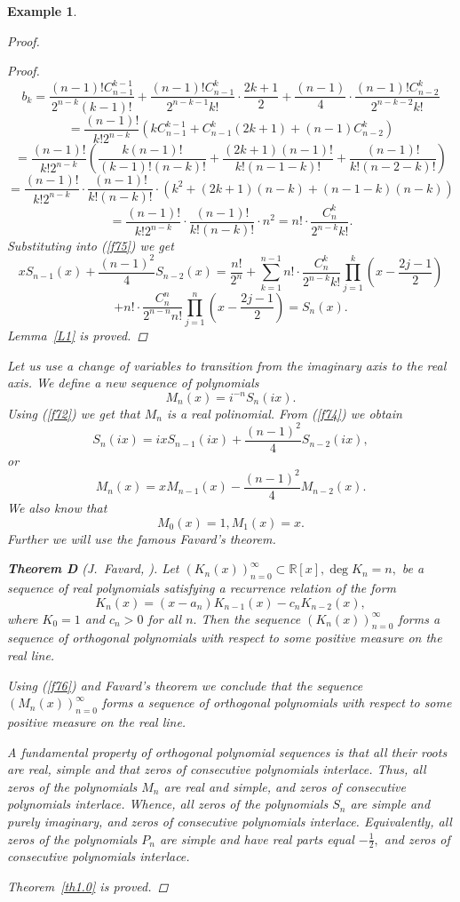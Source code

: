 \documentclass[12pt]{amsart}
\newcounter{count}
\numberwithin{count}{section}
\newtheorem{Example}[count]{Example}
\begin{document}
\begin{Example}
\begin{proof}
\begin{proof}
$$b_k = \frac{(n-1)! C_{n-1}^{k-1}}{2^{n-k} (k-1)!} + 
\frac{(n-1)! C_{n-1}^{k}}{2^{n-k-1} k!}\cdot \frac{2k+1}{2} 
 +\frac{(n-1)}{4} \cdot 
\frac{(n-1)! C_{n-2}^{k}}{2^{n-k-2} k!}     $$
$$= \frac{(n-1)!}{k! 2^{n-k}}\left(k C_{n-1}^{k-1} +C_{n-1}^{k}(2k+1) +
(n-1) C_{n-2}^{k} \right)       $$
$$ = \frac{(n-1)!}{k! 2^{n-k}}\left(\frac{k(n-1)!}{(k-1)!(n-k)!} +\frac{(2k+1)(n-1)!}{k!(n-1-k)!} 
+ \frac{(n-1)!}{k!(n-2-k)!}   \right)    $$
$$    = \frac{(n-1)!}{k! 2^{n-k}} \cdot \frac{(n-1)!}{k!(n-k)!} \cdot \left(k^2 +(2k+1)(n-k) +(n-1-k)(n-k)\right)$$
$$ = \frac{(n-1)!}{k! 2^{n-k}} \cdot \frac{(n-1)!}{k!(n-k)!} \cdot n^2  =n! \cdot \frac{C_n^k}{2^{n-k}k!}.   $$
Substituting into (\ref{f75}) we get
$$ x S_{n-1}(x) + \frac{(n-1)^2}{4} S_{n-2}(x) =  \frac{n!}{2^n}+ \sum_{k=1}^{n-1}  n! \cdot \frac{C_n^k}{2^{n-k}k!}
\prod_{j=1}^k \left(x- \frac{2j-1}{2}\right)$$
$$ +  n! \cdot \frac{C_n^n}{2^{n-n}n!}\prod_{j=1}^n \left(x- \frac{2j-1}{2}\right)  = S_n(x). $$
Lemma~\ref{L1} is proved.
\end{proof}

Let us use a change of variables to transition from the imaginary axis to the
real axis. We define a new sequence of polynomials
$$M_n(x) = i^{-n} S_n(ix).$$
Using (\ref{f72}) we get that $M_n$ is a real polinomial. From (\ref{f74}) we obtain
$$S_n(ix) =  ix S_{n-1}(ix) + \frac{(n-1)^2}{4} S_{n-2}(ix),   $$
or
\begin{equation}
\label{f76}
M_n(x) = x M_{n-1}(x) -\frac{(n-1)^2}{4} M_{n-2}(x).
\end{equation}
We also know that
$$M_0(x)=1,   M_1(x) =x.$$
Further we will use the famous Favard's theorem.

{\bf Theorem D} (J.~Favard, \cite[pp. 15–16]{RaSc}).  {\it     
Let $(K_n(x))_{n=0}^\infty \subset \mathbb{R}[x],  \deg K_n =n,$ be a sequence of
real polynomials satisfying a recurrence relation of the form
$$K_n(x)=(x-a_n) K_{n-1}(x) -c_n K_{n-2}(x),     $$
where $K_0 =1$ and $c_n >0$ for all $n.$   Then the sequence $(K_n(x))_{n=0}^\infty$ 
forms a sequence of orthogonal polynomials with respect to some positive measure on the 
real line.}

Using (\ref{f76}) and Favard's theorem we conclude that the sequence $(M_n(x))_{n=0}^\infty$ 
forms a sequence of orthogonal polynomials with respect to some positive measure on the 
real line. 

A fundamental property of orthogonal polynomial sequences is that all their roots are real,
simple and that zeros of consecutive polynomials interlace. Thus, all zeros of the polynomials $M_n$ 
are real and simple,  and zeros of consecutive polynomials interlace. Whence, all zeros of the 
polynomials $S_n$ are simple and purely imaginary,  and zeros of consecutive polynomials interlace. 
Equivalently, all zeros of the polynomials  $P_n$ are simple and have real parts equal 
$- \frac{1}{2},$  and zeros of consecutive polynomials interlace.

Theorem~\ref{th1.0} is proved.
\end{proof}





\end{Example}
\end{document}
